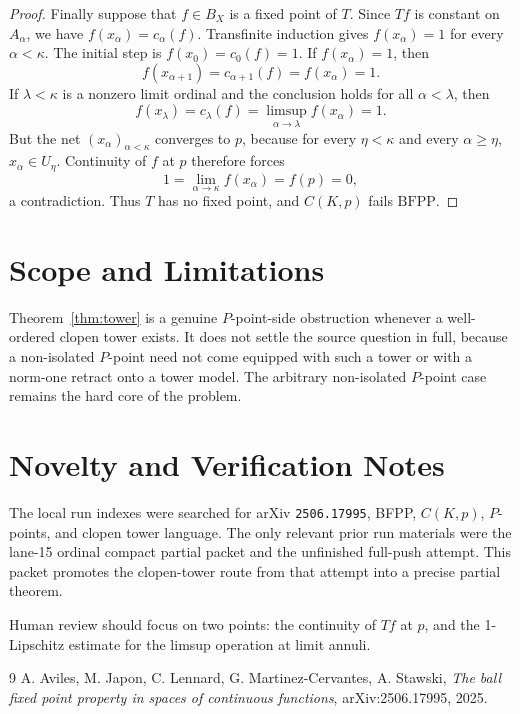 \documentclass[11pt]{article}
\newcommand{\BFPP}{\mathrm{BFPP}}
\begin{document}
\begin{proof}
Finally suppose that \(f\in B_X\) is a fixed point of \(T\).  Since \(Tf\) is
constant on \(A_\alpha\), we have \(f(x_\alpha)=c_\alpha(f)\).  Transfinite
induction gives \(f(x_\alpha)=1\) for every \(\alpha<\kappa\).  The initial
step is \(f(x_0)=c_0(f)=1\).  If \(f(x_\alpha)=1\), then
\[
  f(x_{\alpha+1})=c_{\alpha+1}(f)=f(x_\alpha)=1.
\]
If \(\lambda<\kappa\) is a nonzero limit ordinal and the conclusion holds for
all \(\alpha<\lambda\), then
\[
  f(x_\lambda)=c_\lambda(f)
  =
  \limsup_{\alpha\to\lambda} f(x_\alpha)
  =
  1.
\]
But the net \((x_\alpha)_{\alpha<\kappa}\) converges to \(p\), because for
every \(\eta<\kappa\) and every \(\alpha\ge\eta\), \(x_\alpha\in U_\eta\).
Continuity of \(f\) at \(p\) therefore forces
\[
  1=\lim_{\alpha\to\kappa} f(x_\alpha)=f(p)=0,
\]
a contradiction.  Thus \(T\) has no fixed point, and \(C(K,p)\) fails
\(\BFPP\).
\end{proof}

\section*{Scope and Limitations}

Theorem~\ref{thm:tower} is a genuine \(P\)-point-side obstruction whenever a
well-ordered clopen tower exists.  It does not settle the source question in
full, because a non-isolated \(P\)-point need not come equipped with such a
tower or with a norm-one retract onto a tower model.  The arbitrary
non-isolated \(P\)-point case remains the hard core of the problem.

\section*{Novelty and Verification Notes}

The local run indexes were searched for arXiv \texttt{2506.17995}, BFPP,
\(C(K,p)\), \(P\)-points, and clopen tower language.  The only relevant prior
run materials were the lane-15 ordinal compact partial packet and the
unfinished full-push attempt.  This packet promotes the clopen-tower route from
that attempt into a precise partial theorem.

Human review should focus on two points: the continuity of \(Tf\) at \(p\),
and the 1-Lipschitz estimate for the limsup operation at limit annuli.

\begin{thebibliography}{9}
A. Aviles, M. Japon, C. Lennard, G. Martinez-Cervantes, A. Stawski,
\emph{The ball fixed point property in spaces of continuous functions},
arXiv:2506.17995, 2025.
\end{thebibliography}
\end{document}
